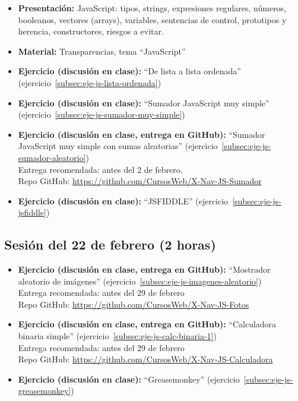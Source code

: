 \documentclass[a4paper,12pt]{report}
\begin{document}
\begin{itemize}
\item \textbf{Presentación:} JavaScript: tipos, strings, expresiones regulares, números, booleanos, vectores (arrays), variables, sentencias de control, prototipos y herencia, constructores, riesgos a evitar.
\item \textbf{Material:} Transparencias, tema ``JavaScript''
\item \textbf{Ejercicio (discusión en clase):} ``De lista a lista ordenada'' (ejercicio~\ref{subsec:eje-js-lista-ordenada})
\item \textbf{Ejercicio (discusión en clase):} ``Sumador JavaScript muy simple'' (ejercicio~\ref{subsec:eje-js-sumador-muy-simple})
\item \textbf{Ejercicio (discusión en clase, entrega en GitHub):} ``Sumador JavaScript muy simple con sumas aleatorias'' (ejercicio~\ref{subsec:eje-js-sumador-aleatorio}) \\
  Entrega recomendada: antes del 2 de febrero. \\
  Repo GitHub: \url{https://github.com/CursosWeb/X-Nav-JS-Sumador} \\
\item \textbf{Ejercicio (discusión en clase):} ``JSFIDDLE'' (ejercicio~\ref{subsec:eje-js-jsfiddle})
\end{itemize}


\subsection{Sesión del 22 de febrero (2 horas)}

\begin{itemize}
\item \textbf{Ejercicio (discusión en clase, entrega en GitHub):} ``Mostrador aleatorio de imágenes'' (ejercicio~\ref{subsec:eje-js-imagenes-aleatorio}) \\
  Entrega recomendada: antes del 29 de febrero \\
  Repo GitHub: \url{https://github.com/CursosWeb/X-Nav-JS-Fotos} \\
\item \textbf{Ejercicio (discusión en clase, entrega en GitHub):} ``Calculadora binaria simple'' (ejercicio~\ref{subsec:eje-js-calc-binaria-1}) \\
  Entrega recomendada: antes del 29 de febrero \\
  Repo GitHub: \url{https://github.com/CursosWeb/X-Nav-JS-Calculadora} \\
\item \textbf{Ejercicio (discusión en clase):} ``Greasemonkey'' (ejercicio~\ref{subsec:eje-js-greasemonkey})
\end{itemize}
\end{document}
